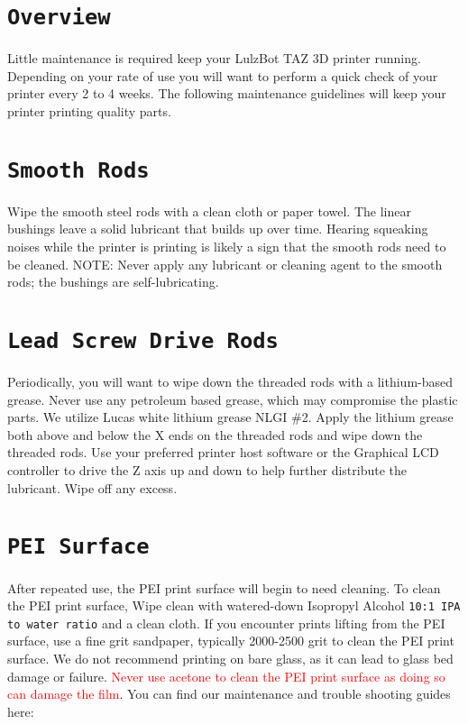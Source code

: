 %
%
%
%
%

\section{\texttt{Overview}}
Little maintenance is required keep your LulzBot\textsuperscript{\miniscule{\textregistered}} TAZ 3D printer running. Depending on your rate of use you will want to perform a quick check of your printer every 2 to 4 weeks. The following maintenance guidelines will keep your printer printing quality parts.

\section{\texttt{Smooth Rods}}
Wipe the smooth steel rods with a clean cloth or paper towel. The linear bushings leave a solid lubricant that builds up over time. Hearing squeaking noises while the printer is printing is likely a sign that the smooth rods need to be cleaned. NOTE: Never apply any lubricant or cleaning agent to the smooth rods; the bushings are self-lubricating.

\section{\texttt{Lead Screw Drive Rods}}
Periodically, you will want to wipe down the threaded rods with a lithium-based grease. Never use any petroleum based grease, which may compromise the plastic parts. We utilize Lucas white lithium grease NLGI \#2. Apply the lithium grease both above and below the X ends on the threaded rods and wipe down the threaded rods. Use your preferred printer host software or the Graphical LCD controller to drive the Z axis up and down to help further distribute the lubricant. Wipe off any excess.

\section{\texttt{PEI Surface}}
After repeated use, the PEI print surface will begin to need cleaning. To clean the PEI print surface, Wipe clean with watered-down Isopropyl Alcohol \texttt{10:1 IPA to water ratio} and a clean cloth. If you encounter prints lifting from the PEI surface, use a fine grit sandpaper, typically 2000-2500 grit to clean the PEI print surface. We do not recommend printing on bare glass, as it can lead to glass bed damage or failure. \textcolor{red}{Never use acetone to clean the PEI print surface as doing so can damage the film}. You can find our maintenance and trouble shooting guides here:

